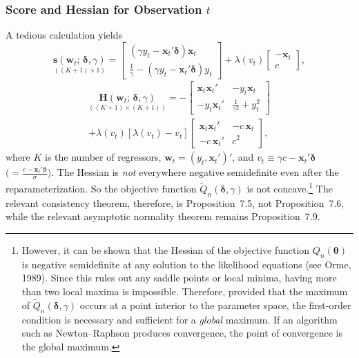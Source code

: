 \subsubsection*{Score and Hessian for Observation \texorpdfstring{$t$}{t}}

A tedious calculation yields
\begin{equation}
  \underset{((K+1) \times 1)}{\mathbf{s}(\mathbf{w}_t;\, \boldsymbol{\delta}, \gamma)}
  = \begin{bmatrix}
      (\gamma y_t - \mathbf{x}_t'\boldsymbol{\delta})\mathbf{x}_t \\[4pt]
      \frac{1}{\gamma} - (\gamma y_t - \mathbf{x}_t'\boldsymbol{\delta})y_t
    \end{bmatrix}
  + \lambda(v_t)
    \begin{bmatrix} -\mathbf{x}_t \\[4pt] c \end{bmatrix},
  \label{eq:8.2.15} \tag{8.2.15}
\end{equation}
\begin{multline}
  \underset{((K+1) \times (K+1))}{\mathbf{H}(\mathbf{w}_t;\, \boldsymbol{\delta}, \gamma)}
  = -\begin{bmatrix}
      \mathbf{x}_t\mathbf{x}_t' & -y_t\mathbf{x}_t \\[4pt]
      -y_t\mathbf{x}_t' & \frac{1}{\gamma^2} + y_t^2
    \end{bmatrix} \\
  + \lambda(v_t)[\lambda(v_t) - v_t]
    \begin{bmatrix}
      \mathbf{x}_t\mathbf{x}_t' & -c\,\mathbf{x}_t \\[4pt]
      -c\,\mathbf{x}_t' & c^2
    \end{bmatrix},
  \label{eq:8.2.16} \tag{8.2.16}
\end{multline}
where $K$ is the number of regressors,
$\mathbf{w}_t = (y_t, \mathbf{x}_t')'$, and
$v_t \equiv \gamma c - \mathbf{x}_t'\boldsymbol{\delta}$ $\bigl(= \frac{c - \mathbf{x}_t'\boldsymbol{\beta}}{\sigma}\bigr)$.
The Hessian is \emph{not} everywhere negative semidefinite even after the reparameterization. So the objective function $\tilde{Q}_n(\boldsymbol{\delta}, \gamma)$ is not concave.\footnote{However, it can be shown that the Hessian of the objective function $Q_n(\boldsymbol{\theta})$ is negative semidefinite at any
solution to the likelihood equations (see Orme, 1989). Since this rules out any saddle points or local minima,
having more than two local maxima is impossible. Therefore, provided that the maximum of
$\tilde{Q}_n(\boldsymbol{\delta}, \gamma)$ occurs at
a point interior to the parameter space, the first-order condition is necessary and sufficient for a \emph{global} maximum.
If an algorithm such as Newton--Raphson produces convergence, the point of convergence is the global maximum.}
The relevant consistency theorem, therefore, is Proposition~7.5, not Proposition~7.6, while the relevant
asymptotic normality theorem remains Proposition~7.9.

